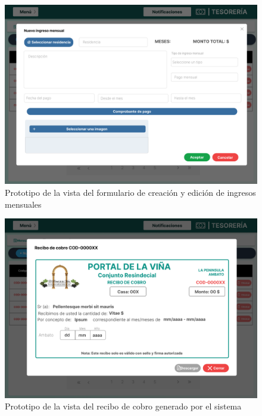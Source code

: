 \begin{figure}[H]
    \centering
    \includegraphics[width=1\textwidth]{resources/images/tesoreia - ingresos - mensuales - edit}
    \caption{Prototipo de la vista del formulario de creación y edición de ingresos mensuales}
    \label{fig:tesoreria-ingresos-mensuales-formulario}
\end{figure}

\begin{figure}[H]
    \centering
    \includegraphics[width=1\textwidth]{resources/images/tesoreia-ingresos-mensuales-recibo}
    \caption{Prototipo de la vista del recibo de cobro generado por el sistema}
    \label{fig:tesoreria-ingresos-mensuales-recibo}
\end{figure}

